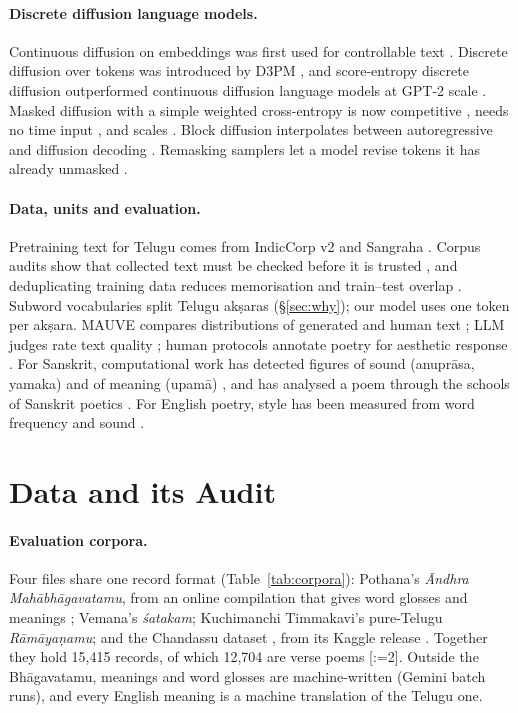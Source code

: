 \documentclass[11pt]{article}
\makeatletter
\DeclareRobustCommand{\exref}[1]{{\scriptsize[\def\ex@sep{}\@for\ex@i:=#1\do{\ex@sep
  \expandafter\ex@item\expandafter{\ex@i}\def\ex@sep{, }}]}}
\newcommand{\ex@item}[1]{\in@{-}{#1}\ifin@\ex@range#1\@nil\else\ex@link{#1}\fi}
\def\ex@range#1-#2\@nil{\ex@link{#1}--\ex@link{#2}}
\newcommand{\ex@link}[1]{\hyperref[exp:E#1]{E#1}}
\makeatother
\begin{document}
\paragraph{Discrete diffusion language models.} Continuous diffusion on embeddings was first used for
controllable text \citep{li2022diffusionlm}. Discrete diffusion over tokens was introduced by D3PM
\citep{austin2021d3pm}, and score-entropy discrete diffusion outperformed continuous diffusion language
models at GPT-2 scale \citep{lou2024sedd}. Masked diffusion with a simple weighted cross-entropy is now
competitive \citep{sahoo2024mdlm,shi2024md4}, needs no time input \citep{ou2025radd,zheng2025timeagnostic},
and scales \citep{nie2025llada}. Block diffusion interpolates between autoregressive and diffusion decoding
\citep{arriola2025block}. Remasking samplers let a model revise tokens it has already unmasked
\citep{wang2025remdm}.

\paragraph{Data, units and evaluation.} Pretraining text for Telugu comes from IndicCorp v2 and Sangraha
\citep{doddapaneni2023indiccorp,khan2024indicllmsuite}. Corpus audits show that collected text must be
checked before it is trusted \citep{kreutzer2022quality,dodge2021c4}, and deduplicating training data
reduces memorisation and train--test overlap \citep{lee2022dedup}. Subword vocabularies split Telugu
akṣaras (\S\ref{sec:why}); our model uses one token per akṣara. MAUVE compares distributions of generated
and human text \citep{pillutla2021mauve}; LLM judges rate text quality \citep{zheng2023judge,liu2023geval};
human protocols annotate poetry for aesthetic response \citep{haider2020poemo}. For Sanskrit, computational
work has detected figures of sound (anuprāsa, yamaka) \citep{barbadikar2024anuprasa,barbadikar2023yamaka}
and of meaning (upamā) \citep{jadhav2025upama}, and has analysed a poem through the schools of Sanskrit
poetics \citep{sandhan2025aesthetics}. For English poetry, style has been measured from word frequency and
sound \citep{kao2012style}.

\section{Data and its Audit}\label{sec:data}

\paragraph{Evaluation corpora.} Four files share one record format (Table~\ref{tab:corpora}): Pothana's
\textit{Āndhra Mahābhāgavatamu}, from an online compilation that gives word glosses and meanings
\citep{pothana15c}; Vemana's \textit{śatakam}; Kuchimanchi Timmakavi's pure-Telugu \textit{Rāmāyaṇamu};
and the Chandassu dataset \citep{boddu2025chandassu}, from its Kaggle release \citep{boddu2025kaggle}.
Together they hold 15,415 records, of which 12,704 are verse poems \exref{2}. Outside the Bhāgavatamu, meanings and
word glosses are machine-written (Gemini batch runs), and every English meaning is a machine translation of
the Telugu one.
\end{document}
